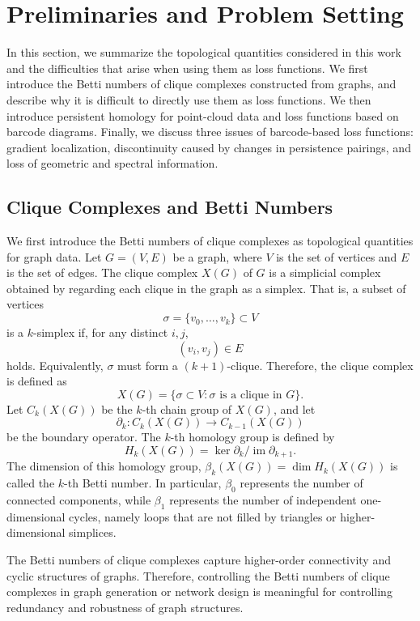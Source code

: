 \documentclass[pdflatex,sn-mathphys-ay]{sn-jnl}%
\theoremstyle{thmstyleone}%
\theoremstyle{thmstyletwo}%
\theoremstyle{thmstylethree}%
\begin{document}
\section{Preliminaries and Problem Setting}

In this section, we summarize the topological quantities considered in this work and the difficulties that arise when using them as loss functions.
We first introduce the Betti numbers of clique complexes constructed from graphs, and describe why it is difficult to directly use them as loss functions.
We then introduce persistent homology for point-cloud data and loss functions based on barcode diagrams.
Finally, we discuss three issues of barcode-based loss functions: gradient localization, discontinuity caused by changes in persistence pairings, and loss of geometric and spectral information.

\subsection{Clique Complexes and Betti Numbers}

We first introduce the Betti numbers of clique complexes as topological quantities for graph data.
Let $G=(V,E)$ be a graph, where \(V\) is the set of vertices and \(E\) is the set of edges.
The clique complex \(X(G)\) of \(G\) is a simplicial complex obtained by regarding each clique in the graph as a simplex.
That is, a subset of vertices
\[
\sigma=\{v_0,\ldots,v_k\}\subset V
\]
is a \(k\)-simplex if, for any distinct \(i,j\),
\[
(v_i,v_j)\in E
\]
holds.
Equivalently, \(\sigma\) must form a \((k+1)\)-clique.
Therefore, the clique complex is defined as
\[
X(G)=\{\sigma\subset V:\sigma \text{ is a clique in }G\}.
\]
Let \(C_k(X(G))\) be the \(k\)-th chain group of \(X(G)\), and let
\[
\partial_k:C_k(X(G))\to C_{k-1}(X(G))
\]
be the boundary operator.
The \(k\)-th homology group is defined by
\[
H_k(X(G))=\ker \partial_k / \operatorname{im}\partial_{k+1}.
\]
The dimension of this homology group, $\beta_k(X(G))=\dim H_k(X(G))$ is called the \(k\)-th Betti number.
In particular, $\beta_0$ represents the number of connected components, while $\beta_1$ represents the number of independent one-dimensional cycles, namely loops that are not filled by triangles or higher-dimensional simplices.

The Betti numbers of clique complexes capture higher-order connectivity and cyclic structures of graphs.
Therefore, controlling the Betti numbers of clique complexes in graph generation or network design is meaningful for controlling redundancy and robustness of graph structures.
\end{document}
